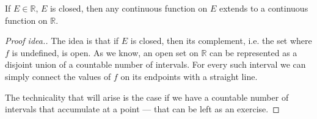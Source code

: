 
\begin{theorem}[Tietze]
    If $E \in \mathbb{R}$, $E$ is closed, then any continuous
    function on $E$ extends to a continuous function on $\mathbb{R}$.
\end{theorem}
\begin{proof}[Proof idea.]
    The idea is that if $E$ is closed, then its complement, i.e.
    the set where $f$ is undefined, is open.
    As we know, an open set on $\mathbb{R}$ can be represented as a disjoint
    union of a countable number of intervals.
    For every such interval we can simply connect the values of $f$
    on its endpoints with a straight line.

    The technicality that will arise is the case if we have a countable
    number of intervals that accumulate at a point --- that can be left 
    as an exercise.
\end{proof}

